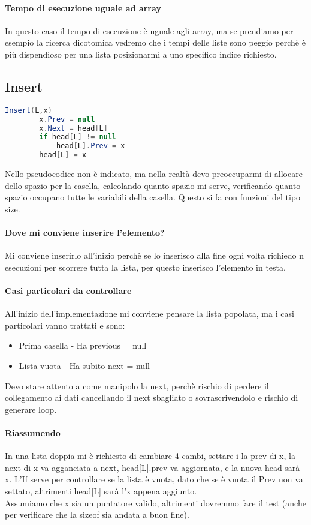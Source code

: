 \paragraph*{Tempo di esecuzione uguale ad array} In questo caso il tempo di esecuzione è uguale
agli array, ma se prendiamo per esempio la ricerca dicotomica vedremo che i tempi delle liste sono
peggio perchè è più dispendioso per una lista posizionarmi a uno specifico indice richiesto.\\
\subsection{Insert}
\begin{lstlisting}[language=Java]
    Insert(L,x)
        x.Prev = null
        x.Next = head[L]
        if head[L] != null
            head[L].Prev = x
        head[L] = x
\end{lstlisting}
Nello pseudocodice non è indicato, ma nella realtà devo preoccuparmi di allocare dello
spazio per la casella, calcolando quanto spazio mi serve, verificando quanto spazio
occupano tutte le variabili della casella. Questo si fa con funzioni del tipo size.
\paragraph*{Dove mi conviene inserire l'elemento?} Mi conviene inserirlo all'inizio
perchè se lo inserisco alla fine ogni volta richiedo n esecuzioni per scorrere tutta la lista, per
questo inserisco l'elemento in testa.
\paragraph*{Casi particolari da controllare} All'inizio dell'implementazione mi conviene pensare la
lista popolata, ma i casi particolari vanno trattati e sono:
\begin{itemize}
    \item Prima casella - Ha previous = null
    \item Lista vuota - Ha subito next = null
\end{itemize}
Devo stare attento a come manipolo la next, perchè rischio di perdere il collegamento
ai dati cancellando il next sbagliato o sovrascrivendolo e rischio di generare loop.
\paragraph*{Riassumendo} In una lista doppia mi è richiesto di cambiare 4 cambi, settare i
la prev di x, la next di x va agganciata a next, head[L].prev va aggiornata, e la nuova
head sarà x. L'If serve per controllare se la lista è vuota, dato che se è vuota il Prev non va
settato, altrimenti head[L] sarà l'x appena aggiunto.\\
Assumiamo che x sia un puntatore valido, altrimenti dovremmo fare il test (anche per verificare
che la sizeof sia andata a buon fine).

